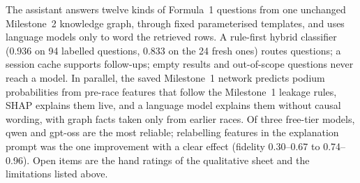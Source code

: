 \documentclass[10pt,a4paper]{article}
\begin{document}
The assistant answers twelve kinds of Formula~1 questions from one unchanged Milestone~2 knowledge graph, through fixed parameterised templates, and uses language models only to word the retrieved rows. A rule-first hybrid classifier (0.936 on 94 labelled questions, 0.833 on the 24 fresh ones) routes questions; a session cache supports follow-ups; empty results and out-of-scope questions never reach a model. In parallel, the saved Milestone~1 network predicts podium probabilities from pre-race features that follow the Milestone~1 leakage rules, SHAP explains them live, and a language model explains them without causal wording, with graph facts taken only from earlier races. Of three free-tier models, qwen and gpt-oss are the most reliable; relabelling features in the explanation prompt was the one improvement with a clear effect (fidelity 0.30--0.67 to 0.74--0.96). Open items are the hand ratings of the qualitative sheet and the limitations listed above.
\end{document}
